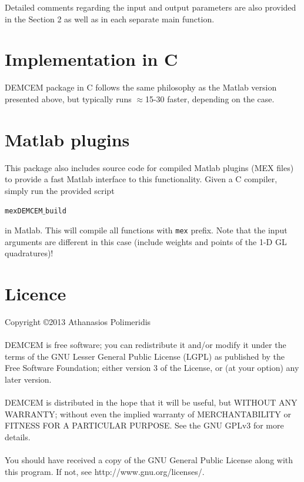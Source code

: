 \documentclass[a4wide,11pt]{article}
\begin{document}
Detailed comments regarding the input and output parameters are also provided in the Section 2 as well as in each separate main function.

\section{Implementation in C}

DEMCEM package in C follows the same philosophy as the Matlab version presented above, but typically runs $\approx$15-30 faster, depending on the case.


\section{Matlab plugins}

This package also includes source code for compiled Matlab plugins
(MEX files) to provide a fast Matlab interface to this functionality.
Given a C compiler, simply run the provided script


      \texttt{mexDEMCEM$\_$build}


\noindent in Matlab. This will compile all functions with \texttt{mex} prefix. Note that the input arguments are different in this case (include weights and points of the 1-D GL quadratures)!


\section*{Licence}

Copyright \copyright 2013 Athanasios Polimeridis
\\\\
\noindent DEMCEM is free software; you can redistribute it and/or modify it under the terms of the GNU Lesser General Public License (LGPL) as published by the Free Software Foundation; either version 3 of the License, or (at your option) any later version.
\\\\
\noindent DEMCEM is distributed in the hope that it will be useful, but WITHOUT ANY WARRANTY; without even the implied warranty of MERCHANTABILITY or FITNESS FOR A PARTICULAR PURPOSE. See the GNU GPLv3 for more details.
\\\\
\noindent You should have received a copy of the GNU General Public License along with this program. If not, see http://www.gnu.org/licenses/.
\end{document}
